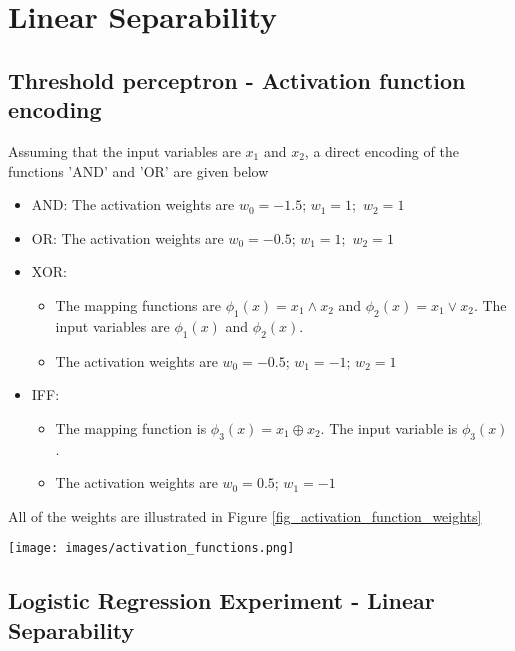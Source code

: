 \documentclass[a4paper]{article}
\begin{document}
\section{Linear Separability}

\subsection{Threshold perceptron - Activation function encoding}
Assuming that the input variables are $x_1$ and $x_2$, a direct encoding of the functions 'AND' and 'OR' are given below
\begin{itemize}
	\item AND: The activation weights are $w_0 = -1.5$; $w_1 = 1;$ $w_2 = 1$
	\item OR: The activation weights are $w_0 = -0.5$; $w_1 = 1;$ $w_2 = 1$
	\item XOR: 
		\begin{itemize}
			\item The mapping functions are $\phi_1(x) = x_1 \land x_2$ and $\phi_2(x) = x_1 \lor x_2$. The input variables are $\phi_1(x)$ and $\phi_2(x)$.
			\item The activation weights are $w_0 = -0.5$; $w_1 = -1$; $w_2 = 1$
		\end{itemize}
	\item IFF: 
		\begin{itemize}
			\item The mapping function is $\phi_3(x) = x_1 \oplus x_2$. The input variable is $\phi_3(x)$.
			\item The activation weights are $w_0 = 0.5$; $w_1 = -1$
		\end{itemize}
\end{itemize}
All of the weights are illustrated in Figure \ref{fig_activation_function_weights}

\begin{figure*}[h]
    \centering
    \texttt{[image: images/activation\_functions.png]}
    \caption{Activation Function Weights}
    \label{fig_activation_function_weights}
\end{figure*}

\newpage

\subsection{Logistic Regression Experiment - Linear Separability}
\end{document}
